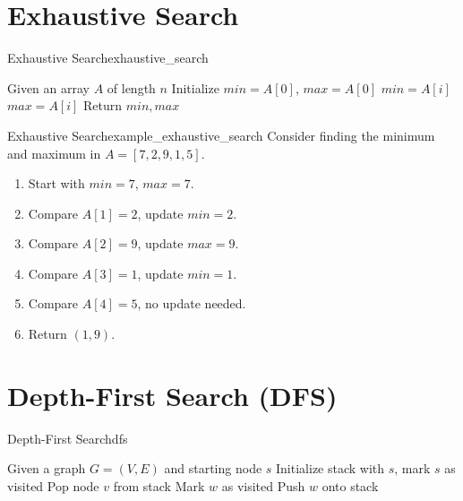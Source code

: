 
\section{Exhaustive Search}
\begin{algorithmtcb}
    {Exhaustive Search}{exhaustive_search}
    \begin{algorithmic}
        \State Given an array $A$ of length $n$
        \State Initialize $min = A[0]$, $max = A[0]$
                \State $min = A[i]$
            \EndIf
                \State $max = A[i]$
            \EndIf
        \EndFor
        \State Return $min, max$
    \end{algorithmic}
\end{algorithmtcb}

\begin{exampletcb}
    {Exhaustive Search}{example_exhaustive_search}
    Consider finding the minimum and maximum in $A = [7, 2, 9, 1, 5]$.

    \begin{enumerate}
        \item Start with $min = 7$, $max = 7$.
        \item Compare $A[1] = 2$, update $min = 2$.
        \item Compare $A[2] = 9$, update $max = 9$.
        \item Compare $A[3] = 1$, update $min = 1$.
        \item Compare $A[4] = 5$, no update needed.
        \item Return $(1, 9)$.
    \end{enumerate}
\end{exampletcb}


\section{Depth-First Search (DFS)}
\begin{algorithmtcb}
    {Depth-First Search}{dfs}
    \begin{algorithmic}
        \State Given a graph $G = (V, E)$ and starting node $s$
        \State Initialize stack with $s$, mark $s$ as visited
            \State Pop node $v$ from stack
                \State Mark $w$ as visited
                \State Push $w$ onto stack
            \EndFor
        \EndWhile
    \end{algorithmic}
\end{algorithmtcb}

